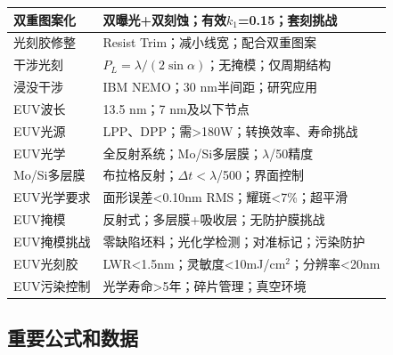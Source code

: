 \documentclass[UTF8,12pt,a4paper]{ctexart}
\begin{document}
\begin{longtable}{|L{4.5cm}|L{10.5cm}|}
双重图案化 & 双曝光+双刻蚀；有效$k_1$=0.15；套刻挑战 \\
\hline

光刻胶修整 & Resist Trim；减小线宽；配合双重图案 \\
\hline

干涉光刻 & $P_L=\lambda/(2\sin\alpha)$；无掩模；仅周期结构 \\
\hline

浸没干涉 & IBM NEMO；30 nm半间距；研究应用 \\
\hline

EUV波长 & 13.5 nm；7 nm及以下节点 \\
\hline

EUV光源 & LPP、DPP；需>180W；转换效率、寿命挑战 \\
\hline

EUV光学 & 全反射系统；Mo/Si多层膜；$\lambda$/50精度 \\
\hline

Mo/Si多层膜 & 布拉格反射；$\Delta t<\lambda$/500；界面控制 \\
\hline

EUV光学要求 & 面形误差<0.10nm RMS；耀斑<7\%；超平滑 \\
\hline

EUV掩模 & 反射式；多层膜+吸收层；无防护膜挑战 \\
\hline

EUV掩模挑战 & 零缺陷坯料；光化学检测；对准标记；污染防护 \\
\hline

EUV光刻胶 & LWR<1.5nm；灵敏度<10mJ/cm$^2$；分辨率<20nm \\
\hline

EUV污染控制 & 光学寿命>5年；碎片管理；真空环境 \\
\hline

\end{longtable}

\subsection{重要公式和数据}
\end{document}
